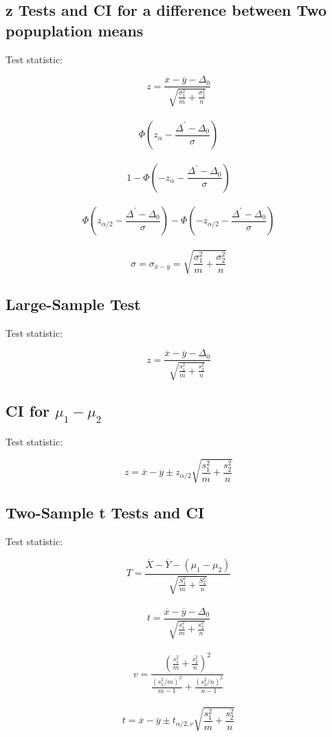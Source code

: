 \documentclass[UTF8]{ctexart}
\numberwithin{equation}{subsection}%
\begin{document}
	\subsection{z Tests and CI for a difference between Two popuplation means}
	Test statistic:
	\begin{Large}
		$$z = \frac{\overline{x}-\overline{y}-\Delta_0}{\sqrt{\frac{\sigma_1^2}{m}+\frac{\sigma_2^2}{n}}}$$
		~\\
		$$\varPhi\left(z_\alpha-\frac{\Delta^{'}-\Delta_0}{\sigma}\right)$$
		~\\		
		$$1-\varPhi\left(-z_\alpha-\frac{\Delta^{'}-\Delta_0}{\sigma}\right)$$
		~\\		
		$$\varPhi\left(z_{\alpha/2}-\frac{\Delta^{'}-\Delta_0}{\sigma}\right)-\varPhi\left(-z_{\alpha/2}-\frac{\Delta^{'}-\Delta_0}{\sigma}\right)$$
	    ~\\
		$$\sigma=\sigma_{\overline{x}-\overline{y}}=\sqrt{\frac{\sigma_1^2}{m}+\frac{\sigma_2^2}{n}}$$
		
	\end{Large}
	\subsection{Large-Sample Test}
	Test statistic:
	\begin{Large}
		$$z = \frac{\overline{x}-\overline{y}-\Delta_0}{\sqrt{\frac{s_1^2}{m}+\frac{s_2^2}{n}}}$$
	\end{Large}
	\subsection{CI for $\mu_1-\mu_2$}
	Test statistic:
	\begin{Large}
		$$z = \overline{x}-\overline{y}\pm z_{\alpha/2}\sqrt{\frac{s_1^2}{m}+\frac{s_2^2}{n}}$$
	\end{Large}
	\subsection{Two-Sample t Tests and CI }
	Test statistic:
	\begin{Large}
		$$T = \frac{\overline{X}-\overline{Y}-(\mu_1-\mu_2)}{\sqrt{\frac{S_1^2}{m}+\frac{S_2^2}{n}}}$$
		~\\
		$$t = \frac{\overline{x}-\overline{y}-\Delta_0}{\sqrt{\frac{s_1^2}{m}+\frac{s_2^2}{n}}}$$
		~\\
		$$v = \frac{\left(\frac{s_1^2}{m}+\frac{s_2^2}{n}\right)^2}{\frac{\left(s_1^2 / m\right)^2}{m-1}+\frac{\left(s_2^2 / n\right)^2}{n-1}}$$
	    ~\\
	    $$t = \overline{x}-\overline{y}\pm t_{\alpha/2,v}\sqrt{\frac{s_1^2}{m}+\frac{s_2^2}{n}}$$
		
	\end{Large}
\end{document}
